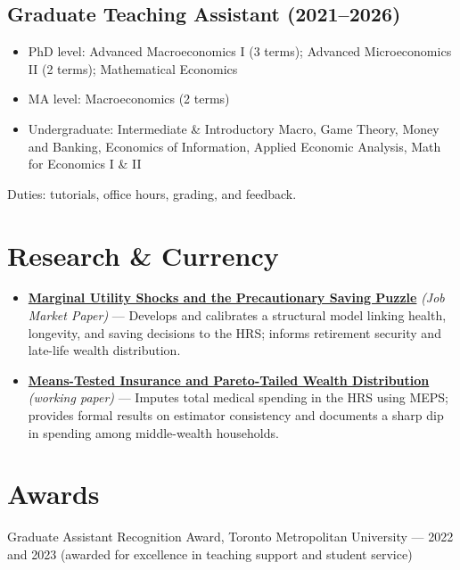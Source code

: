 \documentclass[10.5pt]{article}
\begin{document}
	\subsection*{Graduate Teaching Assistant (2021--2026)}
	\begin{itemize}[leftmargin=*, itemsep=1pt, topsep=2pt]
		\item PhD level: Advanced Macroeconomics I (3 terms); Advanced Microeconomics II (2 terms); Mathematical Economics
		\item MA level: Macroeconomics (2 terms)
		\item Undergraduate: Intermediate \& Introductory Macro, Game Theory, Money and Banking, Economics of Information, Applied Economic Analysis, Math for Economics I \& II
	\end{itemize}
	
	Duties: tutorials, office hours, grading, and feedback.

		
	\section{Research \& Currency}

	\begin{itemize}[leftmargin=*, itemsep=1pt, topsep=2pt]
	\item \href{https://aminshz.github.io/my-website/paper1.pdf}{\textbf{Marginal Utility Shocks and the Precautionary Saving Puzzle}} \textit{(Job Market Paper)} ---
		Develops and calibrates a structural model linking health, longevity, and saving decisions to the HRS;
		informs retirement security and late-life wealth distribution.

	\item \href{https://aminshz.github.io/my-website/paper2.pdf}{\textbf{Means-Tested Insurance and Pareto-Tailed Wealth Distribution}} \textit{(working paper)} ---
		Imputes total medical spending in the HRS using MEPS; provides formal results on estimator consistency
		and documents a sharp dip in spending among middle-wealth households.

	\end{itemize}


	\section{Awards}
	Graduate Assistant Recognition Award, Toronto Metropolitan University --- 2022 and 2023 (awarded for excellence in teaching support and student service)
\end{document}
